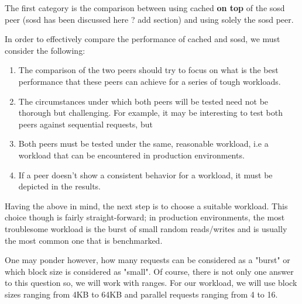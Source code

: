 The first category is the comparison between using cached \textbf{on top} of 
the sosd peer (sosd has been discussed here ? \fixme add section) and using 
solely the sosd peer.

\begin{comment}
The category's goal is to "defend" one of the core thesis arguments, that 
tiering is a key element that will improve the performance of Archipelago.  
\end{comment}

In order to effectively compare the performance of cached and sosd, we must 
consider the following: 

\begin{enumerate}
	\item The comparison of the two peers should try to focus on what is 
		the best performance that these peers can achieve for a series 
		of tough workloads.
	\item The circumstances under which both peers will be tested need not 
		be thorough but challenging. For example, it may be interesting 
		to test both peers against sequential requests, but
	\item Both peers must be tested under the same, reasonable workload, i.e a 
		workload that can be encountered in production environments.
	\item If a peer doesn't show a consistent behavior for a workload, it must 
		be depicted in the results.
\end{enumerate}

Having the above in mind, the next step is to choose a suitable workload.  This 
choice though is fairly straight-forward; in production environments, the most 
troublesome workload is the burst of small random reads/writes and is usually 
the most common one that is benchmarked.  

One may ponder however, how many requests can be considered as a "burst" or 
which block size is considered as "small". Of course, there is not only one 
answer to this question so, we will work with ranges. For our workload, we will 
use block sizes ranging from 4KB to 64KB and parallel requests ranging from 4 
to 16.

